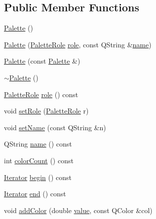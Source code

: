 \subsection*{Public Member Functions}
\begin{DoxyCompactItemize}
\item 
\mbox{\hyperlink{class_palette_a6eb6cac583a840b5251897e3403eac5a}{Palette}} ()
\item 
\mbox{\hyperlink{class_palette_afc6b1651561efffe92d8674a490fe4f4}{Palette}} (\mbox{\hyperlink{palettemanager_8h_adf4610684920d9165d0d74c1ea45b269}{Palette\+Role}} \mbox{\hyperlink{class_palette_a2212ef50b1124725707c033bbedc786f}{role}}, const Q\+String \&\mbox{\hyperlink{class_palette_a61cddb7f609b76b9671ee6d6a71ec7ec}{name}})
\item 
\mbox{\hyperlink{class_palette_ae9db18fffcf23b425f18c1ab9e7bb43f}{Palette}} (const \mbox{\hyperlink{class_palette}{Palette}} \&)
\item 
\mbox{\hyperlink{class_palette_a393b22e84156e4f62694589e02e5597d}{$\sim$\+Palette}} ()
\item 
\mbox{\hyperlink{palettemanager_8h_adf4610684920d9165d0d74c1ea45b269}{Palette\+Role}} \mbox{\hyperlink{class_palette_a2212ef50b1124725707c033bbedc786f}{role}} () const
\item 
void \mbox{\hyperlink{class_palette_a57075ba2fd02e46ebbb71b50da50316c}{set\+Role}} (\mbox{\hyperlink{palettemanager_8h_adf4610684920d9165d0d74c1ea45b269}{Palette\+Role}} r)
\item 
void \mbox{\hyperlink{class_palette_a4b4e532bf85b9807e0899251e6a32a8c}{set\+Name}} (const Q\+String \&n)
\item 
Q\+String \mbox{\hyperlink{class_palette_a61cddb7f609b76b9671ee6d6a71ec7ec}{name}} () const
\item 
int \mbox{\hyperlink{class_palette_ad9e523affae4c20d18c5d5c869b60d52}{color\+Count}} () const
\item 
\mbox{\hyperlink{class_palette_adbfe061d30e0b5f90145bd302003fab0}{Iterator}} \mbox{\hyperlink{class_palette_a64b2a69c619f433af4aafb480e6abacf}{begin}} () const
\item 
\mbox{\hyperlink{class_palette_adbfe061d30e0b5f90145bd302003fab0}{Iterator}} \mbox{\hyperlink{class_palette_aedc1961e7663b2e4a1b0494c1ead99d6}{end}} () const
\item 
void \mbox{\hyperlink{class_palette_ab27411efee73addab0025834f47414ce}{add\+Color}} (double \mbox{\hyperlink{diffusion_8cpp_a4b41795815d9f3d03abfc739e666d5da}{value}}, const Q\+Color \&col)
\item 

\end{DoxyCompactItemize}
